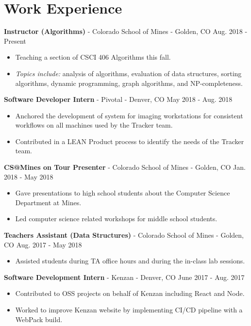 \documentclass[10pt,letterpaper]{article}
\begin{document}
\section*{Work Experience}
\textbf{Instructor (Algorithms)} - Colorado School of Mines - Golden, CO
\hfill Aug. 2018 - Present
\begin{itemize}
    \item Teaching a section of CSCI 406 Algorithms this fall.
    \item \textit{Topics include:} analysis of algorithms, evaluation of data
        structures, sorting algorithms, dynamic programming, graph algorithms,
        and NP-completeness.
\end{itemize}

\textbf{Software Developer Intern} - Pivotal - Denver, CO
\hfill May 2018 - Aug. 2018
\begin{itemize}
    \item Anchored the development of system for imaging workstations for
        consistent workflows on all machines used by the Tracker team.
    \item Contributed in a LEAN Product process to identify the needs of the
        Tracker team.
\end{itemize}

\vspace{2pt}
\textbf{CS@Mines on Tour Presenter} - Colorado School of Mines -
Golden, CO \hfill Jan. 2018 - May 2018
\begin{itemize}
    \item Gave presentations to high school students about the Computer Science
        Department at Mines.
    \item Led computer science related workshops for middle school students.
\end{itemize}

\vspace{2pt}
\textbf{Teachers Assistant (Data Structures)} - Colorado School of Mines -
Golden, CO \hfill Aug. 2017 - May 2018
\begin{itemize}
    \item Assisted students during TA office hours and during the in-class lab
        sessions.
\end{itemize}

\vspace{2pt}
\textbf{Software Development Intern} - Kenzan - Denver, CO
\hfill June 2017 - Aug. 2017
\begin{itemize}
    \item Contributed to OSS projects on behalf of Kenzan including React and
        Node.
    \item Worked to improve Kenzan website by implementing CI/CD pipeline with
        a WebPack build.
\end{itemize}
\end{document}
